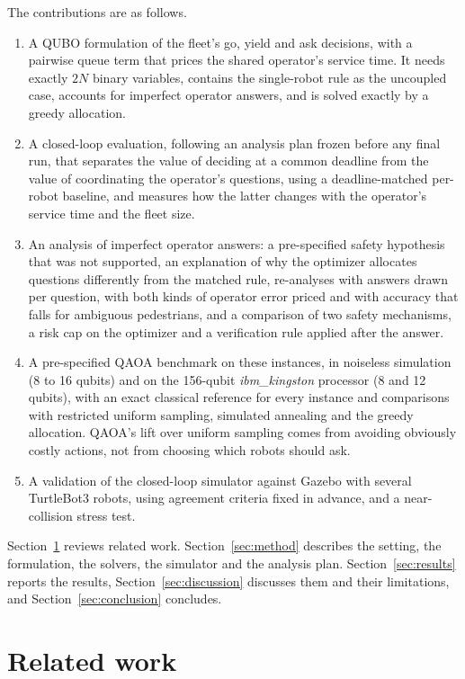 \documentclass[a4paper,fleqn]{cas-dc}
\begin{document}
The contributions are as follows.
\begin{enumerate}
\item A QUBO formulation of the fleet's go, yield and ask decisions, with a pairwise queue term that prices the shared operator's service time. It needs exactly $2N$ binary variables, contains the single-robot rule as the uncoupled case, accounts for imperfect operator answers, and is solved exactly by a greedy allocation.
\item A closed-loop evaluation, following an analysis plan frozen before any final run, that separates the value of deciding at a common deadline from the value of coordinating the operator's questions, using a deadline-matched per-robot baseline, and measures how the latter changes with the operator's service time and the fleet size.
\item An analysis of imperfect operator answers: a pre-specified safety hypothesis that was not supported, an explanation of why the optimizer allocates questions differently from the matched rule, re-analyses with answers drawn per question, with both kinds of operator error priced and with accuracy that falls for ambiguous pedestrians, and a comparison of two safety mechanisms, a risk cap on the optimizer and a verification rule applied after the answer.
\item A pre-specified QAOA benchmark on these instances, in noiseless simulation (8 to 16 qubits) and on the 156-qubit \textit{ibm\_kingston} processor (8 and 12 qubits), with an exact classical reference for every instance and comparisons with restricted uniform sampling, simulated annealing and the greedy allocation. QAOA's lift over uniform sampling comes from avoiding obviously costly actions, not from choosing which robots should ask.
\item A validation of the closed-loop simulator against Gazebo with several TurtleBot3 robots, using agreement criteria fixed in advance, and a near-collision stress test.
\end{enumerate}

Section~\ref{sec:related} reviews related work. Section~\ref{sec:method} describes the setting, the formulation, the solvers, the simulator and the analysis plan. Section~\ref{sec:results} reports the results, Section~\ref{sec:discussion} discusses them and their limitations, and Section~\ref{sec:conclusion} concludes.


\section{Related work}
\label{sec:related}
\end{document}
